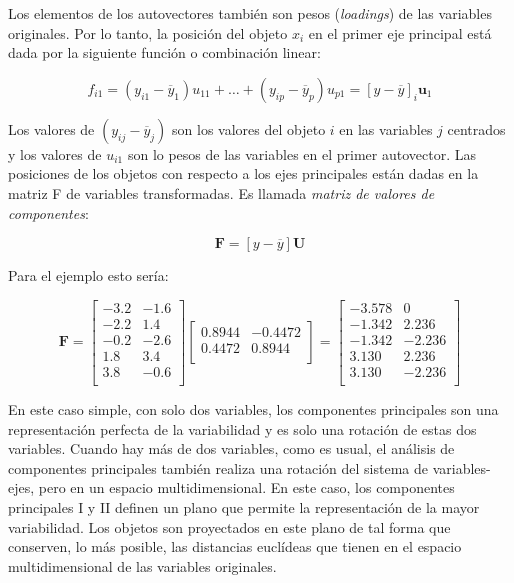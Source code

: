 \documentclass[]{book}
\theoremstyle{definition}
\theoremstyle{definition}
\theoremstyle{definition}
\theoremstyle{remark}
\begin{document}
Los elementos de los autovectores también son pesos (\emph{loadings}) de
las variables originales. Por lo tanto, la posición del objeto \(x_{i}\)
en el primer eje principal está dada por la siguiente función o
combinación linear:

\[
f_{i1} = \left( y_{i1} - {\overline{y}}_{1} \right)u_{11} + \ldots + \left( y_{ip} - {\overline{y}}_{p} \right)u_{p1} = \left\lbrack y - \overline{y} \right\rbrack_{i}\mathbf{u}_{1}
\]

Los valores de \(\left( y_{ij} - {\overline{y}}_{j} \right)\) son los
valores del objeto \(i\) en las variables \(j\) centrados y los valores
de \(u_{i1}\) son lo pesos de las variables en el primer autovector. Las
posiciones de los objetos con respecto a los ejes principales están
dadas en la matriz F de variables transformadas. Es llamada \emph{matriz
de valores de componentes}:

\[
\mathbf{F} = \left\lbrack y - \overline{y} \right\rbrack\mathbf{U}
\]

Para el ejemplo esto sería:

\[
\mathbf{F} = \begin{bmatrix}
 - 3.2 & - 1.6 \\
 - 2.2 & 1.4 \\
 - 0.2 & - 2.6 \\
1.8 & 3.4 \\
3.8 & - 0.6 \\
\end{bmatrix}\begin{bmatrix}
0.8944 & - 0.4472 \\
0.4472 & 0.8944 \\
\end{bmatrix} = \begin{bmatrix}
 - 3.578 & 0 \\
 - 1.342 & 2.236 \\
 - 1.342 & - 2.236 \\
3.130 & 2.236 \\
3.130 & - 2.236 \\
\end{bmatrix}
\]

En este caso simple, con solo dos variables, los componentes principales
son una representación perfecta de la variabilidad y es solo una
rotación de estas dos variables. Cuando hay más de dos variables, como
es usual, el análisis de componentes principales también realiza una
rotación del sistema de variables-ejes, pero en un espacio
multidimensional. En este caso, los componentes principales I y II
definen un plano que permite la representación de la mayor variabilidad.
Los objetos son proyectados en este plano de tal forma que conserven, lo
más posible, las distancias euclídeas que tienen en el espacio
multidimensional de las variables originales.
\end{document}
